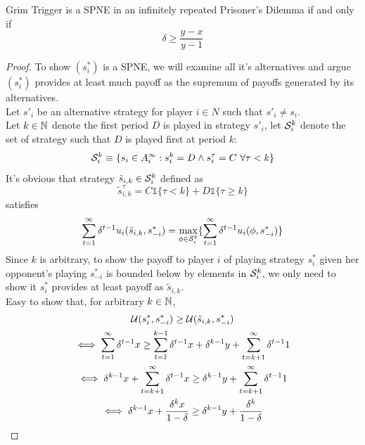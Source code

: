 \documentclass[11pt]{article}
\begin{document}
					\begin{proposition} Grim Trigger is a SPNE in an infinitely repeated Prisoner's Dilemma if and only if 
						\begin{equation}
							\delta \geq \frac{y-x}{y-1}
						\end{equation}
						\begin{proof}
							To show $(s^*_i)$ is a SPNE, we will examine all it's alternatives and argue $(s^*_i)$ provides at least much payoff as the supremum of payoffs generated by its alternatives. \\
							Let $s'_i$ be an alternative strategy for player $i \in N$ such that $s'_i \neq s_i$. \\
							Let $k \in \mathbb{N}$ denote the first period $D$ is played in strategy $s'_i$, let $\mathcal{{S}}^k_i$ denote the set of strategy such that $D$ is played first at period $k$:
							\begin{equation}
								\mathcal{{S}}^k_i \equiv \{s_i \in A_i^\infty: s_i^k = D \land s_i^{\tau} = C\ \forall \tau < k\}
							\end{equation}
							It's obvious that strategy $\tilde{s}_{i,k} \in \mathcal{{S}}_i^k$ defined as 
							\begin{equation}
								\tilde{s}_{i,k}^{\tau} = C \mathds{1}\{\tau < k\} + D \mathds{1}\{\tau \geq k\}
							\end{equation}
							satisfies
							\begin{equation}
								\sum_{t=1}^\infty \delta^{t-1} u_i(\tilde{s}_{i,k}, s_{-i}^*) = \max_{\phi \in \mathcal{{S}}^k_i} \{\sum_{t=1}^\infty \delta^{t-1} u_i(\phi, s_{-i}^*)\}
							\end{equation}
							Since $k$ is arbitrary, to show the payoff to player $i$ of playing strategy $s_i^*$ given her opponent's playing $s_{-i}^*$ is bounded below by elements in $\mathcal{{S}}_i^k$, we only need to show it $s_i^*$ provides at least payoff as $\tilde{s}_{i,k}$. \\
							Easy to show that, for arbitrary $k \in \mathbb{N}$,
							\begin{gather}
								\mc{U}(s_i^*, s_{-i}^*) \geq \mc{U}(\tilde{s}_{i,k}, s_{-i}^*) \\
								\iff \sum_{t=1}^\infty \delta^{t-1} x \geq \sum_{t=1}^{k-1} \delta^{t-1} x + \delta^{k-1} y + \sum_{t=k+1}^\infty \delta^{t-1} 1 \\
								\iff \delta^{k-1} x + \sum_{t=k+1}^\infty \delta^{t-1} x \geq \delta^{k-1} y + \sum_{t=k+1}^\infty \delta^{t-1} 1 \\
								\iff \delta^{k-1}x + \frac{\delta^k x}{1 - \delta} \geq \delta^{k-1} y + \frac{\delta^k}{1 - \delta} \\

\end{gather}
\end{proof}
\end{proposition}
\end{document}
